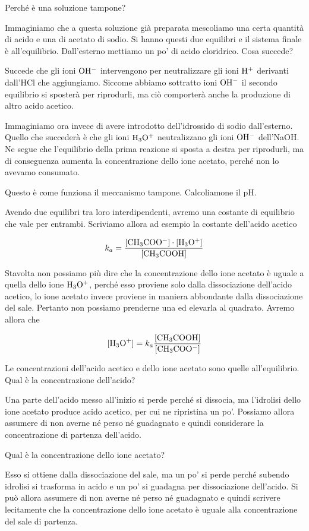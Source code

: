 Perché è una soluzione tampone?

Immaginiamo che a questa soluzione già preparata mescoliamo una certa quantità di acido e una di acetato di sodio. Si hanno questi due equilibri e il sistema finale è all'equilibrio. Dall'esterno mettiamo un po' di acido cloridrico. Cosa succede?

Succede che gli ioni $\rm OH^-$ intervengono per neutralizzare gli ioni $\rm H^+$ derivanti dall'HCl che aggiungiamo. Siccome abbiamo sottratto ioni $\rm OH^-$ il secondo equilibrio si sposterà per riprodurli, ma ciò comporterà anche la produzione di altro acido acetico.

Immaginiamo ora invece di avere introdotto dell'idrossido di sodio dall'esterno. Quello che succederà è che gli ioni $\rm H_3O^+$ neutralizzano gli ioni $\rm OH^-$ dell'NaOH. Ne segue che l'equilibrio della prima reazione si sposta a destra per riprodurli, ma di conseguenza aumenta la concentrazione dello ione acetato, perché non lo avevamo consumato.

Questo è come funziona il meccanismo tampone. Calcoliamone il pH.

Avendo due equilibri tra loro interdipendenti, avremo una costante di equilibrio che vale per entrambi. Scriviamo allora ad esempio la costante dell'acido acetico

$$k_a = \rm{\frac{[CH_3COO^-] \cdot [H_3O^+]}{[CH_3COOH]}}$$

Stavolta non possiamo più dire che la concentrazione dello ione acetato è uguale a quella dello ione $\rm H_3O^+$, perché esso proviene solo dalla dissociazione dell'acido acetico, lo ione acetato invece proviene in maniera abbondante dalla dissociazione del sale. Pertanto non possiamo prenderne una ed elevarla al quadrato. Avremo allora che

$$[\text{H}_3\text{O}^+] = k_a \rm{\frac{[CH_3COOH]}{[CH_3COO^-]}}$$

Le concentrazioni dell'acido acetico e dello ione acetato sono quelle all'equilibrio. Qual è la concentrazione dell'acido?

Una parte dell'acido messo all'inizio si perde perché si dissocia, ma l'idrolisi dello ione acetato produce acido acetico, per cui ne ripristina un po'. Possiamo allora assumere di non averne né perso né guadagnato e quindi considerare la concentrazione di partenza dell'acido.

Qual è la concentrazione dello ione acetato?

Esso si ottiene dalla dissociazione del sale, ma un po' si perde perché subendo idrolisi si trasforma in acido e un po' si guadagna per dissociazione dell'acido. Si può allora assumere di non averne né perso né guadagnato e quindi scrivere lecitamente che la concentrazione dello ione acetato è uguale alla concentrazione del sale di partenza.

